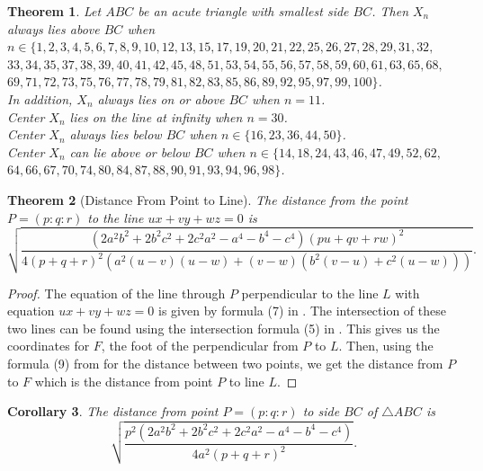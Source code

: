 \documentclass[12pt,a4paper]{amsart}
\newtheorem{theorem}{Theorem} [section]
\newtheorem{corollary}[theorem]{Corollary}
\begin{document}
\begin{theorem}
\label{thm:aboveOrder}
Let $ABC$ be an acute triangle with smallest side $BC$.
Then $X_n$ always lies above $BC$ when\\
$n\in \{1, 2, 3, 4, 5, 6, 7, 8, 9, 10, 12, 13, 15, 17, 19, 20, 21, 22, 25,
26, 27, 28, 29, 31, 32,$\\
$33, 34, 35, 37, 38, 39, 40, 41, 42, 45, 48,
51, 53, 54, 55, 56, 57, 58, 59, 60, 61, 63, 65, 68,$\\
$69, 71, 72, 73, 75, 76, 77, 78, 79, 81, 82, 83, 85, 86, 89, 92, 95, 97, 99, 100\}$.\\
In addition, $X_n$ always lies on or above $BC$ when $n=11$.\\
Center $X_n$ lies on the line at infinity when $n=30$.\\
Center $X_n$ always lies below $BC$ when $n\in \{16, 23, 36, 44, 50\}$.\\
Center $X_n$ can lie above or below $BC$ when
$n\in \{14,18,24,43,46,47,49,52,62,$\\
$64,66,67,70,74,80,84,87,88,90,91,93,94,96,98\}$.
\end{theorem}

\begin{theorem}[Distance From Point to Line]
\label{thm:distToLine}
The distance from the point\goodbreak $P=(p:q:r)$ to the line $ux+vy+wz=0$ is
$$\sqrt{\frac{\left(2a^2b^2+2b^2c^2+2c^2a^2-a^4-b^4-c^4\right) (p u+q v+r w)^2}{4 (p+q+r)^2 \left(a^2 (u-v) (u-w)+(v-w)
   \left(b^2 (v-u)+c^2 (u-w)\right)\right)}}.$$
\end{theorem}

\begin{proof}
The equation of the line through $P$ perpendicular to the line $L$ with equation  $ux+vy+wz=0$ is
given by formula (7) in \cite{Grozdev}. The intersection of these two lines can be found using
the intersection formula (5) in  \cite{Grozdev}. This gives us the coordinates for $F$, the foot
of the perpendicular from $P$ to $L$. Then, using the formula (9) from \cite{Grozdev} for the
distance between two points, we get the distance from $P$ to $F$ which is the distance from point $P$
to line $L$.
\end{proof}

\begin{corollary}
\label{cor:distToLine}
The distance from point $P=(p:q:r)$ to side $BC$ of $\triangle ABC$ is
$$\sqrt{\frac{p^2 \left(2a^2b^2+2b^2c^2+2c^2a^2-a^4-b^4-c^4\right)}{4 a^2 (p+q+r)^2}}.$$
\end{corollary}
\end{document}

